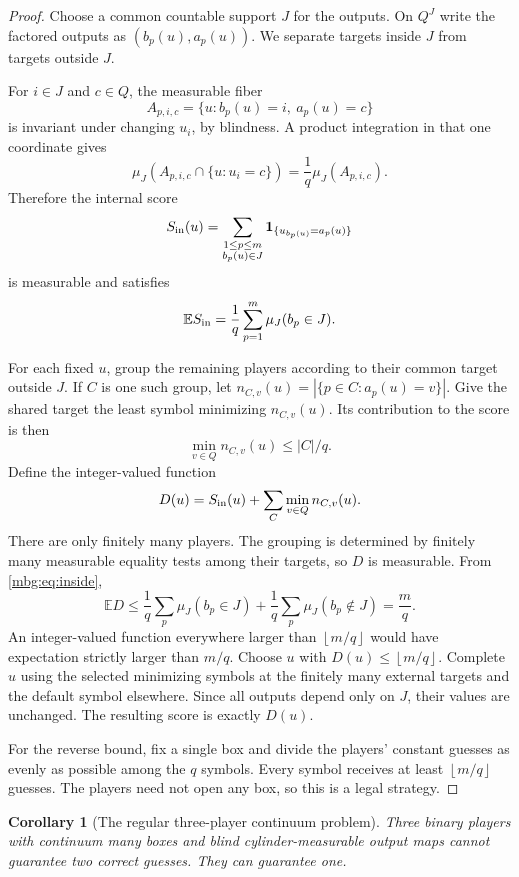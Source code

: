 \documentclass[11pt,letterpaper]{article}
\newtheorem{corollary}[theorem]{Corollary}
\theoremstyle{definition}
\newcommand{\E}{\mathbb E}
\newcommand{\ind}{\mathbf 1}
\newcommand{\floor}[1]{\left\lfloor #1\right\rfloor}
\begin{document}
\begin{proof}
Choose a common countable support $J$ for the outputs. On $Q^J$ write the factored outputs as $(b_p(u),a_p(u))$. We separate targets inside $J$ from targets outside $J$.

For $i\in J$ and $c\in Q$, the measurable fiber
\[
 A_{p,i,c}=\{u:b_p(u)=i,\ a_p(u)=c\}
\]
is invariant under changing $u_i$, by blindness. A product integration in that one coordinate gives
\begin{equation}
 \mu_J(A_{p,i,c}\cap\{u:u_i=c\})=\frac1q\mu_J(A_{p,i,c}).
 \label{mbg:eq:fiberfair}
\end{equation}
Therefore the internal score
\[
 S_{\rm in}(u)=\sum_{\substack{1\le p\le m\\ b_p(u)\in J}}
                  \ind_{\{u_{b_p(u)}=a_p(u)\}}
\]
is measurable and satisfies
\begin{equation}
 \E S_{\rm in}=\frac1q\sum_{p=1}^m\mu_J(b_p\in J).
 \label{mbg:eq:inside}
\end{equation}

For each fixed $u$, group the remaining players according to their common target outside $J$. If $C$ is one such group, let
$n_{C,v}(u)=|\{p\in C:a_p(u)=v\}|$. Give the shared target the least symbol minimizing $n_{C,v}(u)$. Its contribution to the score is then
\[
 \min_{v\in Q}n_{C,v}(u)\le |C|/q.
\]
Define the integer-valued function
\[
 D(u)=S_{\rm in}(u)+\sum_C\min_{v\in Q}n_{C,v}(u).
\]
There are only finitely many players. The grouping is determined by finitely many measurable equality tests among their targets, so $D$ is measurable. From \eqref{mbg:eq:inside},
\[
 \E D\le\frac1q\sum_p\mu_J(b_p\in J)
          +\frac1q\sum_p\mu_J(b_p\notin J)=\frac mq.
\]
An integer-valued function everywhere larger than $\floor{m/q}$ would have expectation strictly larger than $m/q$. Choose $u$ with $D(u)\le\floor{m/q}$. Complete $u$ using the selected minimizing symbols at the finitely many external targets and the default symbol elsewhere. Since all outputs depend only on $J$, their values are unchanged. The resulting score is exactly $D(u)$.

For the reverse bound, fix a single box and divide the players' constant guesses as evenly as possible among the $q$ symbols. Every symbol receives at least $\floor{m/q}$ guesses. The players need not open any box, so this is a legal strategy.
\end{proof}

\begin{corollary}[The regular three-player continuum problem]
Three binary players with continuum many boxes and blind cylinder-measurable output maps cannot guarantee two correct guesses. They can guarantee one.
\end{corollary}
\end{document}
